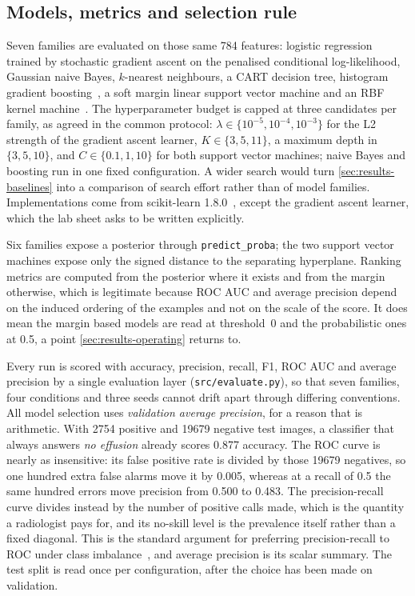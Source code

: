 \subsection{Models, metrics and selection rule}
\label{sec:protocol-metrics}

Seven families are evaluated on those same \num{784} features: logistic
regression trained by stochastic gradient ascent on the penalised conditional
log-likelihood, Gaussian naive Bayes, $k$-nearest neighbours, a CART decision
tree, histogram gradient boosting~\cite{ke2017lightgbm}, a soft margin linear
support vector machine and an RBF kernel machine~\cite{cortes1995support}. The
hyperparameter budget is capped at three candidates per family, as agreed in the
common protocol: $\lambda \in \{10^{-5},10^{-4},10^{-3}\}$ for the L2 strength
of the gradient ascent learner, $K \in \{3,5,11\}$, a maximum depth in
$\{3,5,10\}$, and $C \in \{0.1,1,10\}$ for both support vector machines; naive
Bayes and boosting run in one fixed configuration. A wider search would turn
\cref{sec:results-baselines} into a comparison of search effort rather than of
model families. Implementations come from scikit-learn
1.8.0~\cite{pedregosa2011scikit}, except the gradient ascent learner, which the
lab sheet asks to be written explicitly.

Six families expose a posterior through \texttt{predict\_proba}; the two support
vector machines expose only the signed distance to the separating hyperplane.
Ranking metrics are computed from the posterior where it exists and from the
margin otherwise, which is legitimate because ROC AUC and average precision
depend on the induced ordering of the examples and not on the scale of the
score. It does mean the margin based models are read at threshold~\num{0} and
the probabilistic ones at \num{0.5}, a point \cref{sec:results-operating}
returns to.

Every run is scored with accuracy, precision, recall, F1, ROC AUC and average
precision by a single evaluation layer (\texttt{src/evaluate.py}), so that seven
families, four conditions and three seeds cannot drift apart through differing
conventions. All model selection uses \emph{validation average precision}, for a
reason that is arithmetic. With \num{2754} positive and \num{19679} negative
test images, a classifier that always answers \emph{no effusion} already scores
\num{0.877} accuracy. The ROC curve is nearly as insensitive: its false positive
rate is divided by those \num{19679} negatives, so one hundred extra false
alarms move it by \num{0.005}, whereas at a recall of \num{0.5} the same hundred
errors move precision from \num{0.500} to \num{0.483}. The precision-recall
curve divides instead by the number of positive calls made, which is the
quantity a radiologist pays for, and its no-skill level is the prevalence itself
rather than a fixed diagonal. This is the standard argument for preferring
precision-recall to ROC under class
imbalance~\cite{davis2006relationship,saito2015precision}, and average precision
is its scalar summary. The test split is read once per configuration, after the
choice has been made on validation.

